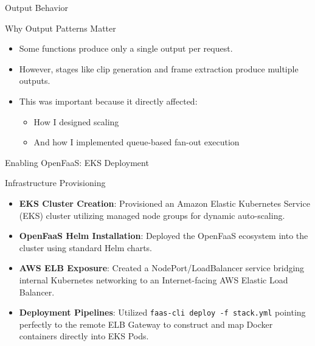 \documentclass[aspectratio=169,10pt]{beamer}
\begin{document}
\begin{frame}{Output Behavior}
    \begin{block}{Why Output Patterns Matter}
        \begin{itemize}[<+->]
            \item Some functions produce only a single output per request.
            \item However, stages like clip generation and frame extraction produce multiple outputs.
            \item This was important because it directly affected:
            \begin{itemize}[<+->]
                \item How I designed scaling
                \item And how I implemented queue-based fan-out execution
            \end{itemize}
        \end{itemize}
    \end{block}
\end{frame}
\begin{frame}{Enabling OpenFaaS: EKS Deployment}
    \begin{block}{Infrastructure Provisioning}
        \begin{itemize}[<+->]
            \item \textbf{EKS Cluster Creation}: Provisioned an Amazon Elastic Kubernetes Service (EKS) cluster utilizing managed node groups for dynamic auto-scaling.
            \item \textbf{OpenFaaS Helm Installation}: Deployed the OpenFaaS ecosystem into the cluster using standard Helm charts.
            \item \textbf{AWS ELB Exposure}: Created a NodePort/LoadBalancer service bridging internal Kubernetes networking to an Internet-facing AWS Elastic Load Balancer.
            \item \textbf{Deployment Pipelines}: Utilized \texttt{faas-cli deploy -f stack.yml} pointing perfectly to the remote ELB Gateway to construct and map Docker containers directly into EKS Pods.
        \end{itemize}
    \end{block}
\end{frame}
\end{document}
